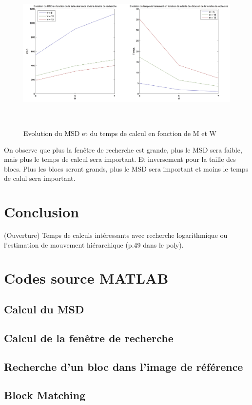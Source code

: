 \documentclass[a4paper, 12pt]{article}
\newcommand{\FSource}[1]{%

}
\begin{document}
\begin{figure}[H]
	\centering
	\includegraphics[height=8cm]{../Resultats/Garden/garden_graph.jpg}
	\caption{Evolution du MSD et du temps de calcul en fonction de M et W}
	\label{fig:garden_graph}
\end{figure}

On observe que plus la fenêtre de recherche est grande, plus le MSD sera faible, mais plus le temps de calcul sera important. Et inversement pour la taille des blocs. Plus les blocs seront grands, plus le MSD sera important et moins le temps de calul sera important.



\newpage

\section{Conclusion}

(Ouverture) Temps de calculs intéressants avec recherche logarithmique ou l'estimation de mouvement hiérarchique (p.49 dans le poly).

\clearpage

%
%
\appendix

\section{Codes source MATLAB}

\subsection{Calcul du MSD}\label{msd_code}

\FSource{../compute_msd.m}

\newpage

\subsection{Calcul de la fenêtre de recherche}\label{search_window}

\FSource{../search_window.m}

\newpage

\subsection{Recherche d'un bloc dans l'image de référence}\label{block_search}

\FSource{../block_matching.m}

\newpage

\subsection{Block Matching}\label{block_matching}

\FSource{../block_matching_encode.m}
\end{document}
